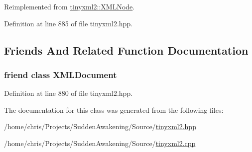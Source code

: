 Reimplemented from \hyperlink{classtinyxml2_1_1_x_m_l_node_a157ce3a00ea5ee5a85b7103138e85e8a}{tinyxml2\-::\-X\-M\-L\-Node}.



Definition at line 885 of file tinyxml2.\-hpp.



\subsection{Friends And Related Function Documentation}
\hypertarget{classtinyxml2_1_1_x_m_l_comment_a4eee3bda60c60a30e4e8cd4ea91c4c6e}{
\subsubsection[{X\-M\-L\-Document}]{\setlength{\rightskip}{0pt plus 5cm}friend class {\bf X\-M\-L\-Document}\hspace{0.3cm}{\ttfamily [friend]}}}\label{classtinyxml2_1_1_x_m_l_comment_a4eee3bda60c60a30e4e8cd4ea91c4c6e}


Definition at line 880 of file tinyxml2.\-hpp.



The documentation for this class was generated from the following files\-:\begin{DoxyCompactItemize}
\item 
/home/chris/\-Projects/\-Sudden\-Awakening/\-Source/\hyperlink{tinyxml2_8hpp}{tinyxml2.\-hpp}\item 
/home/chris/\-Projects/\-Sudden\-Awakening/\-Source/\hyperlink{tinyxml2_8cpp}{tinyxml2.\-cpp}\end{DoxyCompactItemize}
